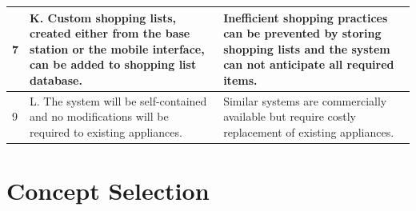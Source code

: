 \documentclass[11pt,letterpaper]{article}
\begin{document}
\begin{table}[h!]
\begin{center}
\begin{tabular}{| p{1.2in} | p{2.5in} |p{2.5in} |}
\hline
7&K. Custom shopping lists, created either from the base station or the mobile interface, can be added to shopping list database.&Inefficient shopping practices can be prevented by storing shopping lists and the system can not anticipate all required items.\\
\hline
9&L. The system will be self-contained and no modifications will be required to existing appliances.&Similar systems are commercially available but require costly replacement of existing appliances.\\
\hline
\end{tabular}
\end{center}
\end{table}
\section{Concept Selection}
\end{document}
